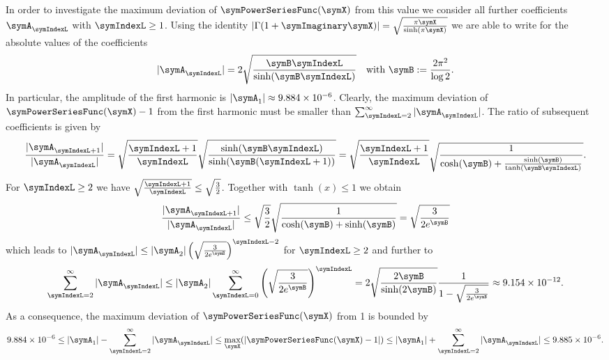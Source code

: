 \documentclass[a4paper]{scrartcl}
\begin{document}
In order to investigate the maximum deviation of $\symPowerSeriesFunc(\symX)$ from this value we consider all further coefficients $\symA_\symIndexL$ with $\symIndexL\geq 1$. Using the identity $\left|\Gamma(1+\symImaginary\symX)\right| = 
\sqrt{\frac{\pi\symX}{\sinh(\pi\symX)}}
$
we are able to write for the absolute values of the coefficients
\begin{equation}
|\symA_\symIndexL| = 
2\sqrt{\frac{\symB\symIndexL}{\sinh(\symB\symIndexL)}}
\quad
\text{with}
\
\symB:=\frac{2\pi^2}{\log 2}.
\end{equation}
In particular, the amplitude of the first harmonic is 
$|\symA_1|
\approx
\num{9.884e-6}$. Clearly, the maximum deviation of $\symPowerSeriesFunc(\symX)-1$ from the first harmonic must be smaller than $\sum_{\symIndexL=2}^{\infty} 
|\symA_\symIndexL|$. The ratio of subsequent coefficients is given by
\begin{equation}
\frac{|\symA_{\symIndexL+1}|}{|\symA_{\symIndexL}|}
=
\sqrt{\frac{\symIndexL+1}{\symIndexL}}
\sqrt{\frac{
\sinh(\symB \symIndexL)
}{
\sinh(\symB (\symIndexL+1))
}}
=
\sqrt{\frac{\symIndexL+1}{\symIndexL}}
\sqrt{\frac{
1
}{
\cosh(\symB)
+
\frac{
\sinh(\symB)
}
{
\tanh(\symB \symIndexL)
}
}}.
\end{equation}
For $\symIndexL\geq 2$ we have $\sqrt{\frac{\symIndexL+1}{\symIndexL}}\leq \sqrt{\frac{3}{2}}$. Together with $\tanh(x)\leq 1$ we obtain
\begin{equation}
\frac{|\symA_{\symIndexL+1}|}{
|\symA_{\symIndexL}|
}
\leq
\sqrt{\frac{3}{2}}
\sqrt{\frac{
1
}{
\cosh(\symB)
+
\sinh(\symB)
}}
\\
=
\sqrt{\frac{
3
}{
2 e^\symB
}}
\end{equation}
which leads to $|\symA_{\symIndexL}| \leq 
|\symA_{2}|
\left(\sqrt{\frac{
3
}{
2 e^\symB
}}\right)^{\symIndexL-2}$ for $\symIndexL\geq 2$ and further to
\begin{equation}
\sum_{\symIndexL=2}^{\infty} 
|\symA_\symIndexL|
\leq
|\symA_2|
\sum_{\symIndexL=0}^{\infty} 
\left(
\sqrt{\frac{
3
}{
2e^\symB
}}
\right)^\symIndexL
=
2\sqrt{
\frac{2\symB}{\sinh(2\symB)}}
\frac{1}{1-
\sqrt{\frac{
3
}{
2 e^\symB
}}
}
\approx
\num{9.154e-12}.
\end{equation}
As a consequence, the maximum deviation of $\symPowerSeriesFunc(\symX)$ from 1 is bounded by
\begin{equation}
\num{9.884e-6}
\leq
|\symA_1|
-
\sum_{\symIndexL=2}^{\infty} 
|\symA_\symIndexL|
\leq
\max_{\symX}(|\symPowerSeriesFunc(\symX)-1|) 
\leq 
|\symA_1|
+
\sum_{\symIndexL=2}^{\infty} 
|\symA_\symIndexL|
\leq 
\num{9.885e-6}.
\end{equation}
\end{document}
